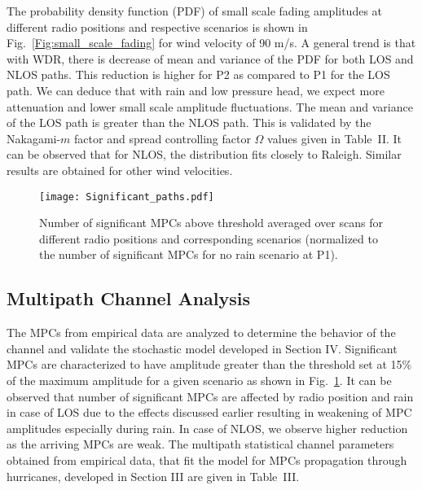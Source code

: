\documentclass[conference]{IEEEtran}
\begin{document}
The probability density function (PDF) of small scale fading amplitudes at different radio positions and respective scenarios is shown in Fig.~\ref{Fig:small_scale_fading} for wind velocity of 90 m/s. A general trend is that with WDR, there is decrease of mean and variance of the PDF for both LOS and NLOS paths. This reduction is higher for P2 as compared to P1 for the LOS path. We can deduce that with rain and low pressure head, we expect more attenuation and lower small scale amplitude fluctuations. The mean and variance of the LOS path is greater than the NLOS path. This is validated by the Nakagami-$m$ factor and spread controlling factor $\Omega$ values given in Table~II. It can be observed that for NLOS, the distribution fits closely to Raleigh. Similar results are obtained for other wind velocities. 

\begin{figure}[!h]
	\centering
	\texttt{[image: Significant\_paths.pdf]}
	\caption{Number of significant MPCs above threshold averaged over scans for different radio positions and corresponding scenarios (normalized to the number of significant MPCs for no rain scenario at P1).
     \vspace{-0.25cm}}\label{Fig:Significant_paths}
\end{figure}
\subsection{Multipath Channel Analysis}
The MPCs from empirical data are analyzed to determine the behavior of the channel and validate the stochastic model developed in Section IV. Significant MPCs are characterized to have amplitude greater than the threshold set at 15\% of the maximum amplitude for a given scenario as shown in Fig.~\ref{Fig:Significant_paths}. It can be observed that number of significant MPCs are affected by radio position and rain in case of LOS due to the effects discussed earlier resulting in weakening of MPC amplitudes especially during rain. In case of NLOS, we observe higher reduction as the arriving MPCs are weak. The multipath statistical channel parameters obtained from empirical data, that fit the model for MPCs propagation through hurricanes, developed in Section III are given in Table~III.



\end{document}
